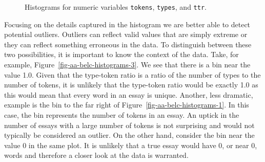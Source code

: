 \documentclass[
  letterpaper,
  DIV=11,
  numbers=noendperiod]{scrreport}
\theoremstyle{definition}
\theoremstyle{remark}
\begin{document}
\begin{figure}

\begin{minipage}[t]{0.33\linewidth}

{\centering 


}

\end{minipage}%
%
\begin{minipage}[t]{0.33\linewidth}

{\centering 


}

\end{minipage}%
%
\begin{minipage}[t]{0.33\linewidth}

{\centering 


}

\end{minipage}%

\caption{\label{fig-aa-belc-histograms}Histograms for numeric variables
\texttt{tokens}, \texttt{types}, and \texttt{ttr}.}

\end{figure}

Focusing on the details captured in the histogram we are better able to
detect potential outliers. Outliers can reflect valid values that are
simply extreme or they can reflect something erroneous in the data. To
distinguish between these two possibilities, it is important to know the
context of the data. Take, for example,
Figure~\ref{fig-aa-belc-histograms-3}. We see that there is a bin near
the value 1.0. Given that the type-token ratio is a ratio of the number
of types to the number of tokens, it is unlikely that the type-token
ratio would be exactly 1.0 as this would mean that every word in an
essay is unique. Another, less dramatic, example is the bin to the far
right of Figure~\ref{fig-aa-belc-histograms-1}. In this case, the bin
represents the number of tokens in an essay. An uptick in the number of
essays with a large number of tokens is not surprising and would not
typically be considered an outlier. On the other hand, consider the bin
near the value 0 in the same plot. It is unlikely that a true essay
would have 0, or near 0, words and therefore a closer look at the data
is warranted.
\end{document}
